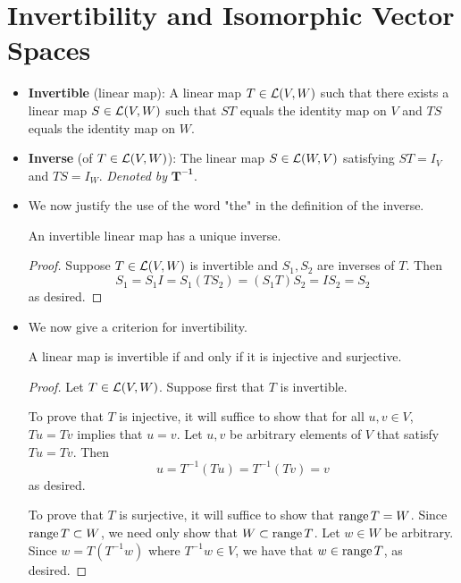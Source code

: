 \documentclass[../main.tex]{subfiles}
\begin{document}
\section{Invertibility and Isomorphic Vector Spaces}
\begin{itemize}
    \item {}\textbf{Invertible} (linear map): A linear map $T\in\mathcal{L}(V,W)$ such that there exists a linear map $S\in\mathcal{L}(V,W)$ such that $ST$ equals the identity map on $V$ and $TS$ equals the identity map on $W$.
    \item \textbf{Inverse} (of $T\in\mathcal{L}(V,W)$): The linear map $S\in\mathcal{L}(W,V)$ satisfying $ST=I_V$ and $TS=I_W$. \emph{Denoted by} $\bm{T^{-1}}$.
    \item We now justify the use of the word "the" in the definition of the inverse.
    \begin{theorem}
        An invertible linear map has a unique inverse.
        \begin{proof}
            Suppose $T\in\mathcal{L}(V,W)$ is invertible and $S_1,S_2$ are inverses of $T$. Then
            \begin{equation*}
                S_1 = S_1I = S_1(TS_2) = (S_1T)S_2 = IS_2 = S_2
            \end{equation*}
            as desired.
        \end{proof}
    \end{theorem}
    \item We now give a criterion for invertibility.
    \begin{theorem}\label{trm:invertibleInjectiveSurjective}
        A linear map is invertible if and only if it is injective and surjective.
        \begin{proof}
            Let $T\in\mathcal{L}(V,W)$. Suppose first that $T$ is invertible.\par
            To prove that $T$ is injective, it will suffice to show that for all $u,v\in V$, $Tu=Tv$ implies that $u=v$. Let $u,v$ be arbitrary elements of $V$ that satisfy $Tu=Tv$. Then
            \begin{equation*}
                u = T^{-1}(Tu) = T^{-1}(Tv) = v
            \end{equation*}
            as desired.\par
            To prove that $T$ is surjective, it will suffice to show that $\operatorname{range} T=W$. Since $\operatorname{range} T\subset W$, we need only show that $W\subset\operatorname{range} T$. Let $w\in W$ be arbitrary. Since $w=T(T^{-1}w)$ where $T^{-1}w\in V$, we have that $w\in\operatorname{range} T$, as desired.\par\smallskip

\end{proof}
\end{theorem}
\end{itemize}
\end{document}
